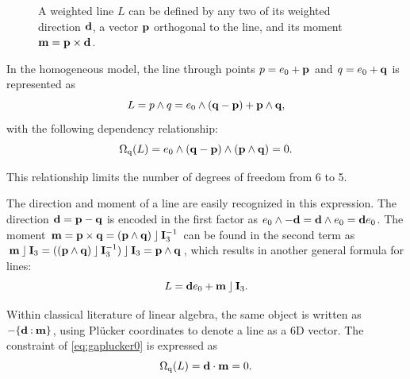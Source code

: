\begin{figure}
  \caption{A weighted line $L$ can be defined by any two of its weighted direction $\mathbf{d}$, a vector $\mathbf{p}$ orthogonal to the line, and its moment $\mathbf{m} = \mathbf{p} \times \mathbf{d}$.}
  \label{fig:linedef}
  \begin{center}
  \end{center}
\end{figure}

In the homogeneous model, the line through points $p = e_0 + \mathbf{p}$ and $q = e_0 + \mathbf{q}$ is represented as 
\begin{equation*}
  L = p \wedge q = e_0 \wedge (\mathbf{q} - \mathbf{p}) + \mathbf{p} \wedge \mathbf{q} ,
\end{equation*}
with the following dependency relationship: 
\begin{equation} \label{eq:gaplucker0} 
  \operatorname{\Omega_q}(L) = e_0 \wedge (\mathbf{q} - \mathbf{p}) \wedge (\mathbf{p} \wedge \mathbf{q}) = 0 .
\end{equation}

This relationship limits the number of degrees of freedom from 6 to 5.

The direction and moment of a line are easily recognized in this expression.  The direction $\mathbf{d} = \mathbf{p} - \mathbf{q}$ is encoded in the first factor as $e_0 \wedge -\mathbf{d} = \mathbf{d} \wedge e_0 = \mathbf{d} e_0$.  
The moment $\mathbf{m} = \mathbf{p} \times \mathbf{q} = (\mathbf{p} \wedge \mathbf{q}) \mathbin{\rfloor} \mathbf{I}_3^{-1}$ can be found in the second term as $\mathbf{m} \mathbin{\rfloor} \mathbf{I}_3 = ((\mathbf{p} \wedge \mathbf{q}) \mathbin{\rfloor} \mathbf{I}_3^{-1}) \mathbin{\rfloor} \mathbf{I}_3 = \mathbf{p} \wedge \mathbf{q}$, which results in another general formula for lines:
\begin{equation*}
  L = \mathbf{d} e_0 + \mathbf{m} \mathbin{\rfloor} \mathbf{I}_3.
\end{equation*}

Within classical literature of linear algebra, the same object is written as $-\{\mathbf{d} \mathbin{:} \mathbf{m}\}$, using Pl\"ucker coordinates to denote a line as a 6D vector.  The constraint of \autoref{eq:gaplucker0} is expressed as 
\begin{equation} \label{eq:laplucker0}
  \operatorname{\Omega_q}(L) = \mathbf{d} \mathbin{\cdot} \mathbf{m} = 0 .
\end{equation}

